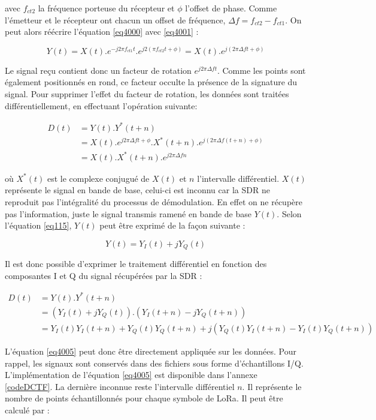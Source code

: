avec $f_{ct2}$ la fréquence porteuse du récepteur et $\phi$ l'offset de phase. Comme l'émetteur et le récepteur ont chacun un offset de fréquence, $\Delta f = f_{ct2} - f_{ct1}$. On peut alors réécrire l'équation \ref{eq4000} avec \ref{eq4001} :

\begin{equation}\label{eq4002}
	Y(t) = X(t) . e^{-j2\pi f_{ct1} t} . e^{j2(\pi f_{ct2} t+ \phi)} = X(t) . e^{j(2\pi \Delta f t + \phi)}
\end{equation} 

Le signal reçu contient donc un facteur de rotation $e^{j2\pi \Delta f t}$. Comme les points sont également positionnés en rond, ce facteur occulte la présence de la signature du signal.
Pour supprimer l'effet du facteur de rotation, les données sont traitées différentiellement, en effectuant l'opération suivante:

\begin{align}\label{eq4003}
	D(t) &= Y(t) . Y^{*}(t+n) \\
		 &= X(t) . e^{j2\pi \Delta f t+ \phi} .X^{*}(t+n) . e^{j(2\pi \Delta f (t + n) + \phi)} \nonumber \\
 		 &= X(t) . X^{*}(t+n) . e^{j2\pi \Delta f n}
\end{align}

où $X^{*}(t)$ est le complexe conjugué de $X(t)$ et $n$ l'intervalle différentiel. $X(t)$ représente le signal en bande de base, celui-ci est inconnu car la \ac{SDR} ne reproduit pas l'intégralité du processus de démodulation. En effet on ne récupère pas l'information, juste le signal transmis ramené en bande de base $Y(t)$. Selon l'équation \ref{eq115}, $Y(t)$ peut être exprimé de la façon suivante : 

\begin{equation}\label{eq4004}
	Y(t) = Y_I(t) + jY_Q(t)
\end{equation} 

Il est donc possible d'exprimer le traitement différentiel en fonction des composantes I et Q du signal récupérées par la \ac{SDR} :

\begin{align}\label{eq4005}
	D(t) &= Y(t) . Y^{*}(t+n) \nonumber \\
		 &= (Y_I(t) + jY_Q(t)) . (Y_I(t+n) - jY_Q(t+n)) \nonumber \\
 		 &= Y_I(t)Y_I(t+n) + Y_Q(t)Y_Q(t+n) + j(Y_Q(t)Y_I(t+n) - Y_I(t)Y_Q(t+n))
\end{align}

L'équation \ref{eq4005} peut donc être directement appliquée sur les données. Pour rappel, les signaux sont conservés dans des fichiers sous forme d'échantillons \ac{I/Q}. L'implémentation de l'équation \ref{eq4005} est disponible dans l'annexe \ref{codeDCTF}. La dernière inconnue reste l'intervalle différentiel $n$. Il représente le nombre de points échantillonnés pour chaque symbole de \ac{LoRa}. Il peut être calculé par :

